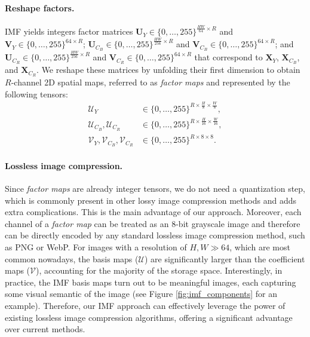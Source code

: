 \paragraph{Reshape factors.} 
IMF yields integers factor matrices $\bm{U}_{Y} \in \{0, \ldots, 255\}^{\frac{HW}{64} \times R}$ and $\bm{V}_{Y} \in \{0, \ldots, 255\}^{64 \times R}$; $\bm{U}_{C_B} \in \{0, \ldots, 255\}^{\frac{HW}{256} \times R}$ and $\bm{V}_{C_B} \in \{0, \ldots, 255\}^{64 \times R}$; and $\bm{U}_{C_R} \in \{0, \ldots, 255\}^{\frac{HW}{256} \times R}$ and $\bm{V}_{C_R} \in \{0, \ldots, 255\}^{64 \times R}$ that correspond to $\bm{X}_{Y}$, $\bm{X}_{C_B}$, and $\bm{X}_{C_R}$. We reshape these matrices by unfolding their first dimension to obtain $R$-channel 2D spatial maps, referred to as \emph{factor maps} and represented by the following tensors:
\begin{align} \label{eq: reshaped factors}
	\bm{\mathcal{U}}_{Y} & \in \{0, \ldots, 255\}^{R \times \frac{H}{8} \times \frac{W}{8}}, \nonumber \\
	\bm{\mathcal{U}}_{C_B}, \bm{\mathcal{U}}_{C_R} & \in \{0, \ldots, 255\}^{R \times \frac{H}{16} \times \frac{W}{16}}, \\
	\bm{\mathcal{V}}_{Y}, \bm{\mathcal{V}}_{C_B}, \bm{\mathcal{V}}_{C_R} & \in \{0, \ldots, 255\}^{R \times 8 \times 8}. \nonumber
\end{align}

\paragraph{Lossless image compression.}
Since \emph{factor maps} are already integer tensors, we do not need a quantization step, which is commonly present in other lossy image compression methods and adds extra complications. This is the main advantage of our approach. Moreover, each channel of a \emph{factor map} can be treated as an 8-bit grayscale image and therefore can be directly encoded by any standard lossless image compression method, such as PNG or WebP. For images with a resolution of $H, W \gg 64$, which are most common nowadays, the basis maps ($\bm{\mathcal{U}}$) are significantly larger than the coefficient maps ($\bm{\mathcal{V}}$), accounting for the majority of the storage space. Interestingly, in practice, the IMF basis maps turn out to be meaningful images, each capturing some visual semantic of the image (see Figure \ref{fig:imf_components} for an example). Therefore, our IMF approach can effectively leverage the power of existing lossless image compression algorithms, offering a significant advantage over current methods.

